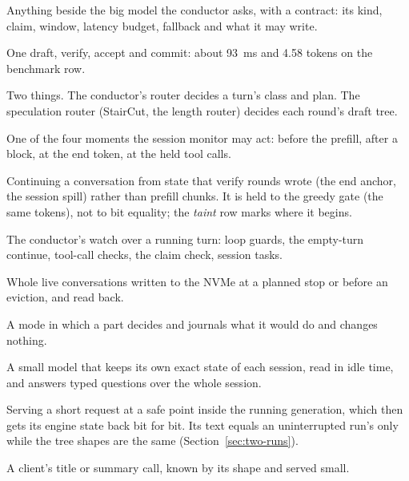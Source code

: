 \begin{description}[style=unboxed, leftmargin=0pt, itemsep=.5ex, font=\normalfont\bfseries]
\item[role] Anything beside the big model the conductor asks, with a contract: its kind, claim, window, latency budget, fallback and what it may write.

\item[round] One draft, verify, accept and commit: about 93~ms and 4.58 tokens on the benchmark row.

\item[router] Two things. The conductor's router decides a turn's class and plan. The speculation router (StairCut, the length router) decides each round's draft tree.

\item[safe point] One of the four moments the session monitor may act: before the prefill, after a block, at the end token, at the held tool calls.

\item[session resume] Continuing a conversation from state that verify rounds wrote (the end anchor, the session spill) rather than prefill chunks. It is held to the greedy gate (the same tokens), not to bit equality; the \emph{taint} row marks where it begins.

\item[session monitor] The conductor's watch over a running turn: loop guards, the empty-turn continue, tool-call checks, the claim check, session tasks.

\item[session spill] Whole live conversations written to the NVMe at a planned stop or before an eviction, and read back.

\item[shadow] A mode in which a part decides and journals what it would do and changes nothing.

\item[shadow reader] A small model that keeps its own exact state of each session, read in idle time, and answers typed questions over the whole session.

\item[side lane] Serving a short request at a safe point inside the running generation, which then gets its engine state back bit for bit. Its text equals an uninterrupted run's only while the tree shapes are the same (Section~\ref{sec:two-runs}).

\item[side request] A client's title or summary call, known by its shape and served small.


\end{description}
